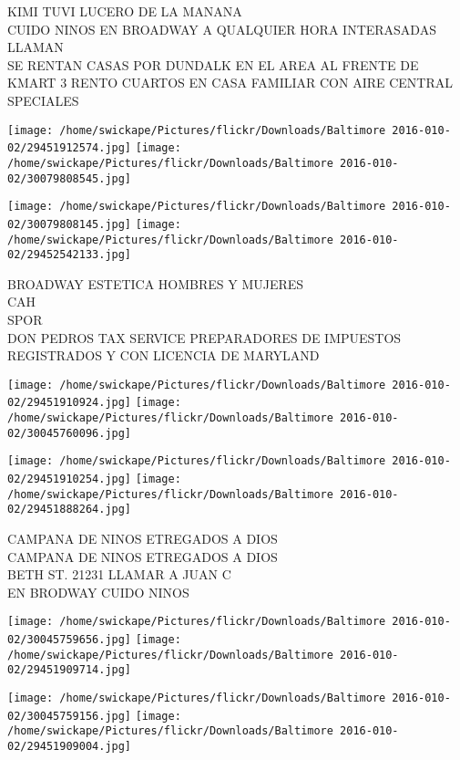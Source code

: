 \documentclass[10pt,letterpaper]{article}
\begin{document}
KIMI TUVI LUCERO DE LA MANANA\\
CUIDO NINOS EN BROADWAY A QUALQUIER HORA INTERASADAS LLAMAN\\
SE RENTAN CASAS POR DUNDALK EN EL AREA AL FRENTE DE KMART 3 RENTO CUARTOS EN CASA FAMILIAR CON AIRE CENTRAL\\
SPECIALES\\
\pagebreak

\texttt{[image: /home/swickape/Pictures/flickr/Downloads/Baltimore 2016-010-02/29451912574.jpg]}
\texttt{[image: /home/swickape/Pictures/flickr/Downloads/Baltimore 2016-010-02/30079808545.jpg]}

\texttt{[image: /home/swickape/Pictures/flickr/Downloads/Baltimore 2016-010-02/30079808145.jpg]}
\texttt{[image: /home/swickape/Pictures/flickr/Downloads/Baltimore 2016-010-02/29452542133.jpg]}

BROADWAY ESTETICA HOMBRES Y MUJERES\\
CAH\\
SPOR\\
DON PEDROS TAX SERVICE PREPARADORES DE IMPUESTOS REGISTRADOS Y CON LICENCIA DE MARYLAND\\
\pagebreak

\texttt{[image: /home/swickape/Pictures/flickr/Downloads/Baltimore 2016-010-02/29451910924.jpg]}
\texttt{[image: /home/swickape/Pictures/flickr/Downloads/Baltimore 2016-010-02/30045760096.jpg]}

\texttt{[image: /home/swickape/Pictures/flickr/Downloads/Baltimore 2016-010-02/29451910254.jpg]}
\texttt{[image: /home/swickape/Pictures/flickr/Downloads/Baltimore 2016-010-02/29451888264.jpg]}

CAMPANA DE NINOS ETREGADOS A DIOS\\
CAMPANA DE NINOS ETREGADOS A DIOS\\
BETH ST. 21231 LLAMAR A JUAN C\\
EN BRODWAY CUIDO NINOS\\
\pagebreak

\texttt{[image: /home/swickape/Pictures/flickr/Downloads/Baltimore 2016-010-02/30045759656.jpg]}
\texttt{[image: /home/swickape/Pictures/flickr/Downloads/Baltimore 2016-010-02/29451909714.jpg]}

\texttt{[image: /home/swickape/Pictures/flickr/Downloads/Baltimore 2016-010-02/30045759156.jpg]}
\texttt{[image: /home/swickape/Pictures/flickr/Downloads/Baltimore 2016-010-02/29451909004.jpg]}
\end{document}
